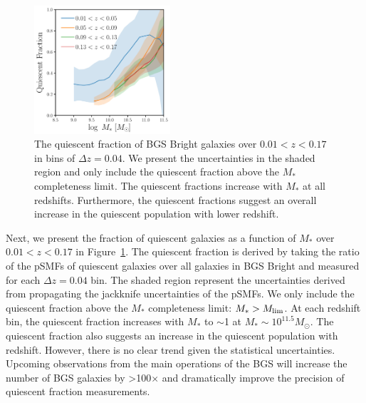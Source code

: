 \begin{figure}
\begin{center}
    \includegraphics[width=0.45\textwidth]{figs/qf_bgs_bright.pdf} 
    \caption{
        The quiescent fraction of BGS Bright galaxies over $0.01 < z < 0.17$ in
        bins of $\Delta z =0.04$.
        We present the uncertainties in the shaded region and only include  
        the quiescent fraction above the $M_*$ completeness limit. 
        The quiescent fractions increase with $M_*$ at all redshifts. 
        Furthermore, the quiescent fractions suggest an overall increase in the
        quiescent population with lower redshift.
    }\label{fig:qf}
\end{center}
\end{figure}

Next, we present the fraction of quiescent galaxies as a function of $M_*$ over
$0.01 < z < 0.17$ in Figure~\ref{fig:qf}.
The quiescent fraction is derived by taking the ratio of the pSMFs of quiescent
galaxies over all galaxies in BGS Bright and measured for each $\Delta z =0.04$
bin.
The shaded region represent the uncertainties derived from propagating the
jackknife uncertainties of the pSMFs. 
We only include the quiescent fraction above the $M_*$ completeness limit: $M_*
> M_{\rm lim}$. 
At each redshift bin, the quiescent fraction increases with $M_*$ to $\sim$1 at
$M_*\sim10^{11.5}M_\odot$. 
The quiescent fraction also suggests an increase in the quiescent population
with redshift. 
However, there is no clear trend given the statistical uncertainties.
Upcoming observations from the main operations of the BGS will increase the
number of BGS galaxies by >100$\times$ and dramatically improve the precision
of quiescent fraction measurements. 
